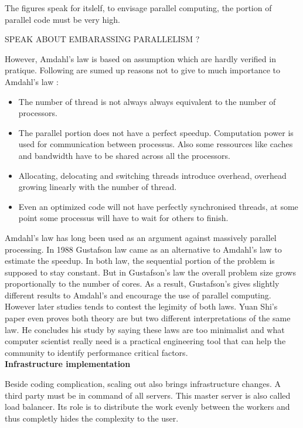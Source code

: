 The figures speak for itslelf, to envisage parallel computing, the portion of
parallel code must be very high.

SPEAK ABOUT EMBARASSING PARALLELISM ?

However, Amdahl's law is based on assumption which are hardly verified in
pratique. Following are sumed up reasons not to give to much importance to
Amdahl's law \citep{Reference34}:

\begin{itemize} 
  \item The number of thread is not always always equivalent to the number of processors.  
  \item The parallel portion does not have a perfect speedup. Computation power is used
    for communication between processus. Also some ressources like caches and bandwidth
    have to be shared across all the processors.  
  \item Allocating, delocating and switching threads introduce overhead, overhead growing
    linearly with the number of thread.  
  \item Even an optimized code will not have perfectly synchronised threads, at some point
    some processus will have to wait for others to finish.	
\end{itemize}


Amdahl's law has long been used as an argument against massively parallel
processing. In 1988 Gustafson law came as an alternative to Amdahl's law to
estimate the speedup. In both law, the sequential portion of the problem is
supposed to stay constant. But in Gustafson's law the overall problem size
grows proportionally to the number of cores. As a result, Gustafson's gives
slightly different results to Amdahl's and encourage the use of parallel
computing.\\

However later studies tends to contest the legimity of both laws. Yuan Shi's
paper \citep{Reference9} even proves both theory are but two different
interpretations of the same law. He concludes his study by saying these laws
are too minimalist and what computer scientist really need is a practical
engineering tool that can help the community to identify performance critical
factors.\\

\textbf{Infrastructure implementation}

Beside coding complication, scaling out also brings infrastructure changes.
A third party must be in command of all servers. This master server is also called
load balancer. Its role is to distribute the work evenly between the workers and thus
completly hides the complexity to the user.\\


